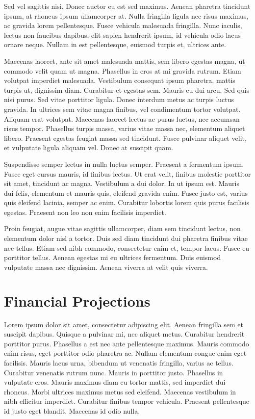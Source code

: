 \documentclass[12pt, letterpaper]{article}
\begin{document}
Sed vel sagittis nisi. Donec auctor eu est sed maximus. Aenean pharetra tincidunt ipsum, at rhoncus ipsum ullamcorper at. Nulla fringilla ligula nec risus maximus, ac gravida lorem pellentesque. Fusce vehicula malesuada fringilla. Nunc iaculis, lectus non faucibus dapibus, elit sapien hendrerit ipsum, id vehicula odio lacus ornare neque. Nullam in est pellentesque, euismod turpis et, ultrices ante.

Maecenas laoreet, ante sit amet malesuada mattis, sem libero egestas magna, ut commodo velit quam ut magna. Phasellus in eros at mi gravida rutrum. Etiam volutpat imperdiet malesuada. Vestibulum consequat ipsum pharetra, mattis turpis ut, dignissim diam. Curabitur et egestas sem. Mauris eu dui arcu. Sed quis nisi purus. Sed vitae porttitor ligula. Donec interdum metus ac turpis luctus gravida. In ultrices sem vitae magna finibus, vel condimentum tortor volutpat. Aliquam erat volutpat. Maecenas laoreet lectus ac purus luctus, nec accumsan risus tempor. Phasellus turpis massa, varius vitae massa nec, elementum aliquet libero. Praesent egestas feugiat massa sed tincidunt. Fusce pulvinar aliquet velit, et vulputate ligula aliquam vel. Donec at suscipit quam.

Suspendisse semper lectus in nulla luctus semper. Praesent a fermentum ipsum. Fusce eget cursus mauris, id finibus lectus. Ut erat velit, finibus molestie porttitor sit amet, tincidunt ac magna. Vestibulum a dui dolor. In ut ipsum est. Mauris dui felis, elementum et mauris quis, eleifend gravida enim. Fusce justo est, varius quis eleifend lacinia, semper ac enim. Curabitur lobortis lorem quis purus facilisis egestas. Praesent non leo non enim facilisis imperdiet.

Proin feugiat, augue vitae sagittis ullamcorper, diam sem tincidunt lectus, non elementum dolor nisl a tortor. Duis sed diam tincidunt dui pharetra finibus vitae nec tellus. Etiam sed nibh commodo, consectetur enim et, tempor lacus. Fusce eu porttitor tellus. Aenean egestas mi eu ultrices fermentum. Duis euismod vulputate massa nec dignissim. Aenean viverra at velit quis viverra.

\section{Financial Projections}
Lorem ipsum dolor sit amet, consectetur adipiscing elit. Aenean fringilla sem et suscipit dapibus. Quisque a pulvinar mi, nec aliquet metus. Curabitur hendrerit porttitor purus. Phasellus a est nec ante pellentesque maximus. Mauris commodo enim risus, eget porttitor odio pharetra ac. Nullam elementum congue enim eget facilisis. Mauris lacus urna, bibendum ut venenatis fringilla, varius ac tellus. Curabitur venenatis rutrum nunc. Mauris in porttitor justo. Phasellus in vulputate eros. Mauris maximus diam eu tortor mattis, sed imperdiet dui rhoncus. Morbi ultrices maximus metus sed eleifend. Maecenas vestibulum in nibh efficitur imperdiet. Curabitur finibus tempor vehicula. Praesent pellentesque id justo eget blandit. Maecenas id odio nulla.
\end{document}
